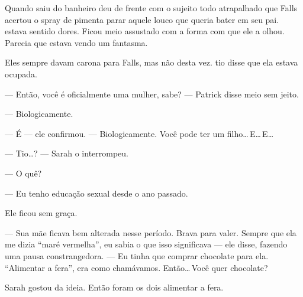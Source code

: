 Quando saiu do banheiro\mudanca{,} deu de frente com o sujeito todo atrapalhado que Falls acertou o spray de pimenta  parar aquele louco que queria bater em seu pai.  estava sentido dores. Ficou meio assustado com a forma com que ele a olhou. Parecia que estava vendo um fantasma.

Eles sempre davam carona para Falls, mas não desta vez.  tio disse que ela estava ocupada.

--- Então, você é oficialmente uma mulher, sabe? --- Patrick disse meio sem jeito.

--- Biologicamente.

--- É --- ele confirmou. --- Biologicamente. Você pode ter um filho\ldots\,E\ldots\,E\ldots

--- Tio\ldots? --- Sarah o interrompeu.

--- O quê?

--- Eu tenho educação sexual desde o ano passado.

Ele ficou sem graça.

--- Sua mãe ficava bem alterada nesse período. Brava para valer. Sempre que ela me dizia ``maré vermelha'', eu sabia o que isso significava --- ele disse, fazendo uma pausa constrangedora. --- Eu tinha que comprar chocolate para ela. ``Alimentar a fera'', era como chamávamos. Então\ldots\,Você quer chocolate?

Sarah gostou da ideia. Então foram os dois alimentar a fera.
